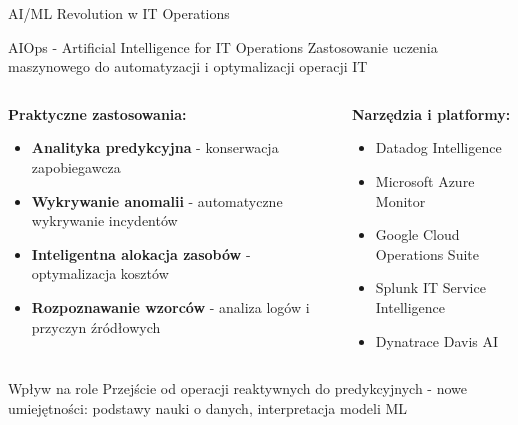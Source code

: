 \documentclass[10pt, aspectratio=169]{beamer}
\begin{document}
\begin{frame}{AI/ML Revolution w IT Operations}
\begin{alertblock}{AIOps - Artificial Intelligence for IT Operations}
Zastosowanie uczenia maszynowego do automatyzacji i optymalizacji operacji IT
\end{alertblock}

\begin{columns}[T]
\begin{column}{0.5\textwidth}
\textbf{Praktyczne zastosowania:}
\begin{itemize}
\item \textbf{Analityka predykcyjna} - konserwacja zapobiegawcza
\item \textbf{Wykrywanie anomalii} - automatyczne wykrywanie incydentów
\item \textbf{Inteligentna alokacja zasobów} - optymalizacja kosztów
\item \textbf{Rozpoznawanie wzorców} - analiza logów i przyczyn źródłowych
\end{itemize}
\end{column}
\begin{column}{0.5\textwidth}
\textbf{Narzędzia i platformy:}
\begin{itemize}
\item Datadog Intelligence
\item Microsoft Azure Monitor
\item Google Cloud Operations Suite
\item Splunk IT Service Intelligence
\item Dynatrace Davis AI
\end{itemize}
\end{column}
\end{columns}

\begin{exampleblock}{Wpływ na role}
Przejście od operacji reaktywnych do predykcyjnych - nowe umiejętności: podstawy nauki o danych, interpretacja modeli ML
\end{exampleblock}
\end{frame}
\end{document}

